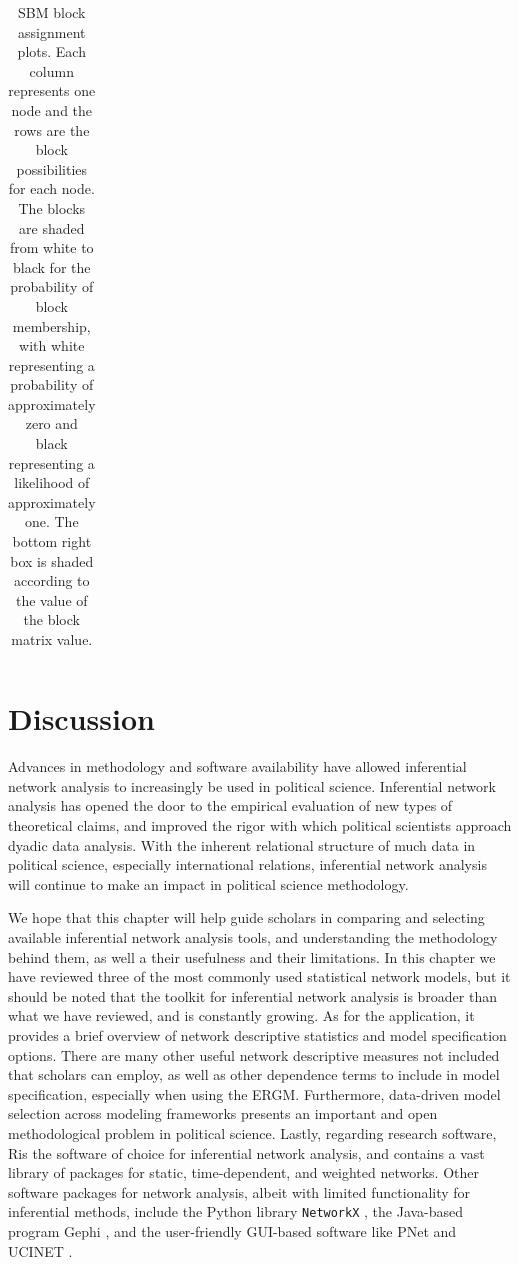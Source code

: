 \documentclass[fleqn,12pt]{wlscirep}
\newcommand{\R}{\textsf{R}\space} %
\begin{document}
\begin{longtable}[!h]{c@{\hskip 0cm}c}
\caption{\label{fig:SBM_plot_1} SBM block assignment plots. Each column represents one node and the rows are the block possibilities for each node. The blocks are shaded from white to black for the probability of block membership, with white representing a probability of approximately zero and black representing a likelihood of approximately one. The bottom right box is shaded according to the value of the block matrix value.}
\end{longtable}


\section{Discussion}


Advances in methodology and software availability have allowed inferential network analysis to increasingly be used in political science. Inferential network analysis has opened the door to the empirical evaluation of new types of theoretical claims, and improved the rigor with which political scientists approach dyadic data analysis. With the inherent relational structure of much data in political science, especially international relations, inferential network analysis will continue to make an impact in political science methodology. 

We hope that this chapter will help guide scholars in comparing and selecting available inferential network analysis tools, and understanding the methodology behind them, as well a their usefulness and their limitations. In this chapter we have reviewed three of the most commonly used statistical network models, but it should be noted that the toolkit for inferential network analysis is broader than what we have reviewed, and is constantly growing. As for the application, it provides a brief overview of network descriptive statistics and model specification options. There are many other useful network descriptive measures not included that scholars can employ, as well as other dependence terms to include in model specification, especially when using the ERGM. Furthermore, data-driven model selection across modeling frameworks presents an important and open methodological problem in political science. Lastly, regarding research software, \R is the software of choice for inferential network analysis, and contains a vast library of packages for static, time-dependent, and weighted networks. Other software packages for network analysis, albeit with limited functionality for inferential methods, include the \textsf{Python} library \texttt{NetworkX} \citep{hagberg2008exploring}, the Java-based program \textsf{Gephi} \citep{bastian2009gephi}, and the user-friendly GUI-based software like \textsf{PNet} \citep{wang2009pnet} and \textsf{UCINET} \citep{borgatti2014ucinet}. 






\clearpage



\end{document}

